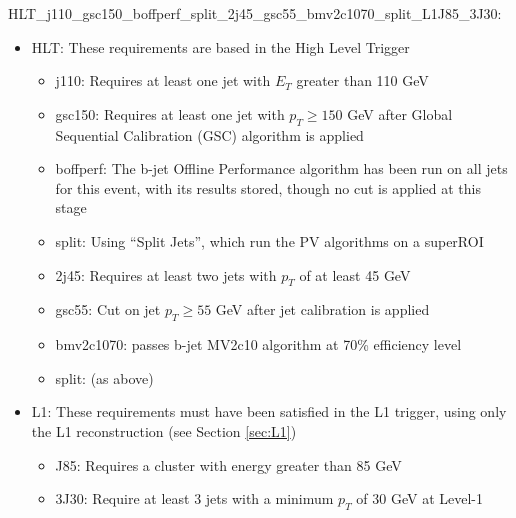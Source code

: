         HLT\_j110\_gsc150\_boffperf\_split\_2j45\_gsc55\_bmv2c1070\_split\_L1J85\_3J30:
        \begin{itemize}
            \item HLT: These requirements are based in the High Level Trigger
                \begin{itemize}
                \item j110: Requires at least one jet with $E_T$ greater than 110 GeV
                \item gsc150: Requires at least one jet with $p_T \geq 150$ GeV after Global Sequential Calibration (GSC) algorithm is applied
                \item boffperf: The b-jet Offline Performance algorithm has been run on all jets for this event,
                    with its results stored, though no cut is applied at this stage
                \item split: Using ``Split Jets'', which run the PV algorithms on a superROI
                \item 2j45: Requires at least two jets with $p_T$ of at least 45 GeV
                \item gsc55: Cut on jet $p_T \geq 55$ GeV after jet calibration is applied
                \item bmv2c1070: passes b-jet MV2c10 algorithm at 70\% efficiency level
                \item split: (as above)
            \end{itemize}
            \item L1: These requirements must have been satisfied in the L1 trigger,
                using only the L1 reconstruction (see Section \ref{sec:L1})
                \begin{itemize}
                \item J85: Requires a cluster with energy greater than 85 GeV
                \item 3J30: Require at least 3 jets with a minimum $p_T$ of 30 GeV at Level-1
            \end{itemize}
        \end{itemize}


        



